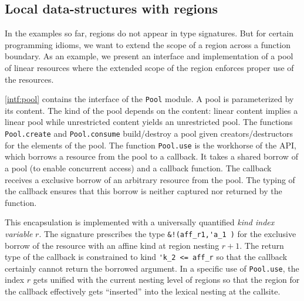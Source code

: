 


\subsection{Local data-structures with regions}
\label{tuto:pool}

In the examples so far, regions do not appear in type signatures.
But for certain programming idioms, we want to extend the scope of a
region across a function boundary. As an example,
we present an interface and implementation of a pool of linear resources where the
extended scope of the region enforces proper use of the resources.

\cref{intf:pool} contains the interface of the \lstinline/Pool/ module.
A pool is parameterized by its content. The kind of the pool
depends on the content: linear content implies
a linear pool while unrestricted content yields an unrestricted pool.
The functions \lstinline/Pool.create/ and \lstinline/Pool.consume/
build/destroy a pool given creators/destructors for the elements
of the pool.
The function \lstinline/Pool.use/ is the workhorse of the API, which
borrows a resource from the pool to a callback.
It takes a shared borrow of a pool (to enable concurrent access) and a
callback function.
The callback receives a exclusive borrow of an arbitrary resource from the pool.
The typing of the callback ensures
that this borrow is neither captured nor returned by the function.

This encapsulation is implemented with a universally quantified \emph{kind index variable} $r$.
The signature prescribes the type \lstinline/&!(aff_r1,'a_1 )/ for the
exclusive borrow of the resource with an affine kind at region nesting $r+1$. The return
type of the callback is constrained to kind \lstinline/'k_2 <= aff_r/
so that the callback certainly cannot return the borrowed argument.
In a specific use of \lstinline/Pool.use/, the index $r$ gets unified
with the current nesting level of regions so that the region for the
callback effectively gets ``inserted'' into the lexical nesting at the callsite.

